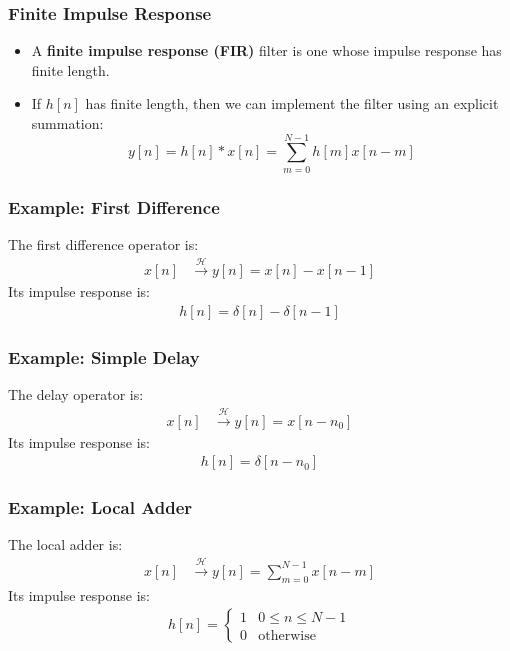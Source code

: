 \documentclass{beamer}
\begin{document}
\begin{frame}
  \frametitle{Finite Impulse Response}

  \begin{itemize}
    \item A {\bf finite impulse response (FIR)} filter is one whose
      impulse response has finite length.
    \item If $h[n]$ has finite length, then we can implement the filter
      using an explicit summation:
      \[
      y[n] = h[n]\ast x[n]=\sum_{m=0}^{N-1} h[m] x[n-m]
      \]
  \end{itemize}
\end{frame}

\begin{frame}
  \frametitle{Example: First Difference}

  The first difference operator is:
  \begin{align*}
  x[n] &\stackrel{\mathcal H}{\longrightarrow} y[n]=x[n]-x[n-1]
  \end{align*}
  Its impulse response is:
  \begin{align*}
    h[n] = \delta[n]-\delta[n-1]
  \end{align*}
\end{frame}
  
\begin{frame}
  \frametitle{Example: Simple Delay}

  The delay operator is:
  \begin{align*}
  x[n] &\stackrel{\mathcal H}{\longrightarrow} y[n]=x[n-n_0]
  \end{align*}
  Its impulse response is:
  \begin{align*}
    h[n] = \delta[n-n_0]
  \end{align*}
\end{frame}
  
\begin{frame}
  \frametitle{Example: Local Adder}

  The local adder is:
  \begin{align*}
  x[n] &\stackrel{\mathcal H}{\longrightarrow} y[n]=\sum_{m=0}^{N-1} x[n-m]
  \end{align*}
  Its impulse response is:
  \begin{align*}
    h[n] = \begin{cases}1 & 0\le n\le N-1\\0&\mbox{otherwise}\end{cases}
  \end{align*}
\end{frame}
\end{document}
